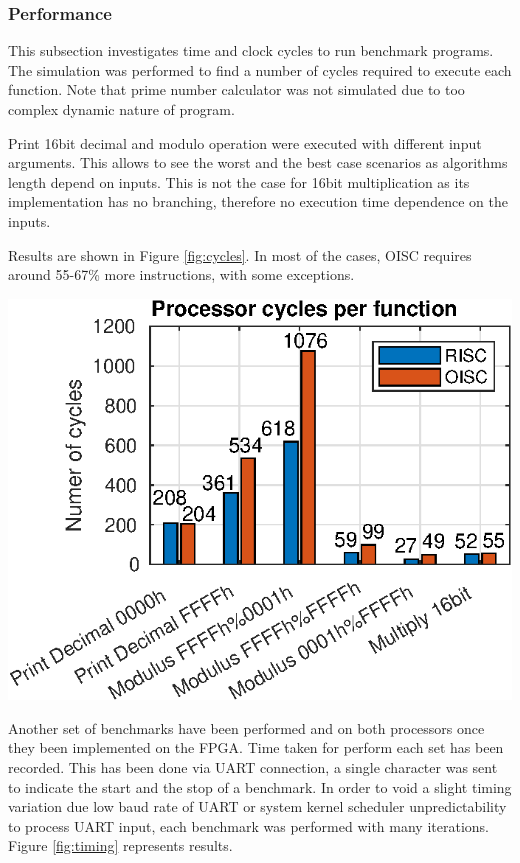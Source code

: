 \subsubsection{Performance}
This subsection investigates time and clock cycles to run benchmark programs. The simulation was performed to find a number of cycles required to execute each function. Note that prime number calculator was not simulated due to too complex dynamic nature of program. 

Print 16bit decimal and modulo operation were executed with different input arguments. This allows to see the worst and the best case scenarios as algorithms length depend on inputs. This is not the case for 16bit multiplication as its implementation has no branching, therefore no execution time dependence on the inputs.

Results are shown in Figure \ref{fig:cycles}. In most of the cases, OISC requires around 55-67\% more instructions, with some exceptions.

\begin{colfigure}
	\centering
	\includegraphics[width=\linewidth]{../tests/cycles.eps}
	\label{fig:cycles}
\end{colfigure}

Another set of benchmarks have been performed and on both processors once they been implemented on the FPGA. Time taken for perform each set has been recorded. This has been done via UART connection, a single character was sent to indicate the start and the stop of a benchmark. In order to void a slight timing variation due low baud rate of UART or system kernel scheduler unpredictability to process UART input, each benchmark was performed with many iterations. Figure \ref{fig:timing} represents results.

